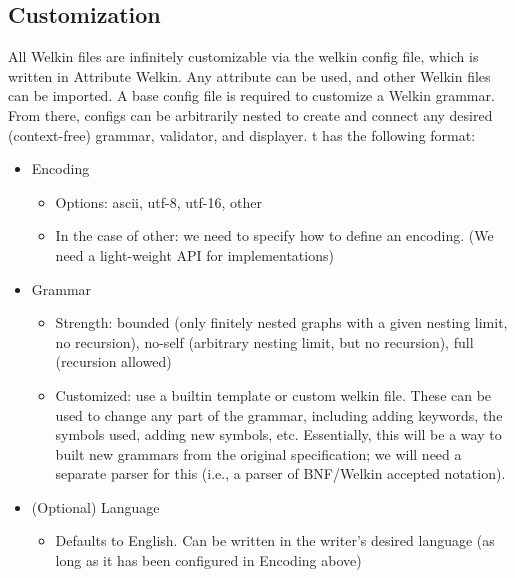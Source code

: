 \subsection{Customization}
All Welkin files are infinitely customizable via the welkin config file, which is written in Attribute Welkin. Any attribute can be used, and other Welkin files can be imported. A base config file is required to customize a Welkin grammar. From there, configs can be arbitrarily nested to create and connect any desired (context-free) grammar, validator, and displayer.
t has the following format:
\begin{itemize}
	\item Encoding
				\begin{itemize}
					\item Options: ascii, utf-8, utf-16, other
					\item In the case of other: we need to specify how to define an encoding. (We need a light-weight API for implementations)
				\end{itemize}
	\item Grammar
				\begin{itemize}
					\item Strength: bounded (only finitely nested graphs with a given nesting limit, no recursion), no-self (arbitrary nesting limit, but no recursion), full (recursion allowed)
					\item Customized: use a builtin template or custom welkin file. These can be used to change any part of the grammar, including adding keywords, the symbols used, adding new symbols, etc. Essentially, this will be a way to built new grammars from the original specification; we will need a separate parser for this (i.e., a parser of BNF/Welkin accepted notation).
				\end{itemize}

	\item (Optional) Language
				\begin{itemize}
					\item Defaults to English. Can be written in the writer's desired language (as long as it has been configured in Encoding above)
				\end{itemize}
\end{itemize}

